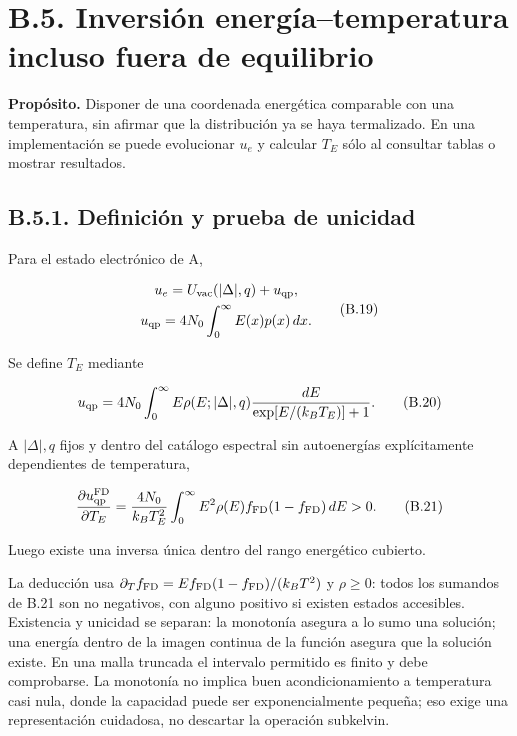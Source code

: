 \documentclass[
  spanish,
  10pt,
  a4paper,
]{article}
\begin{document}
\section{B.5. Inversión energía--temperatura incluso fuera de
equilibrio}\label{b.5.-inversiuxf3n-energuxedatemperatura-incluso-fuera-de-equilibrio}

\textbf{Propósito.} Disponer de una coordenada energética comparable con
una temperatura, sin afirmar que la distribución ya se haya termalizado.
En una implementación se puede evolucionar \(u_e\) y calcular \(T_E\)
sólo al consultar tablas o mostrar resultados.

\subsection{B.5.1. Definición y prueba de
unicidad}\label{b.5.1.-definiciuxf3n-y-prueba-de-unicidad}

Para el estado electrónico de A,

\[
\begin{gathered}
u_e=U_{\rm vac}(|\Delta|,q)+u_{\rm qp},\\
u_{\rm qp}=4N_0\int_0^\infty E(x)p(x)\,dx.
\end{gathered} \tag{B.19}
\]

Se define \(T_E\) mediante

\[
u_{\rm qp}=4N_0\int_0^\infty
E\rho(E;|\Delta|,q)\frac{dE}{\exp[E/(k_BT_E)]+1}.
\tag{B.20}
\]

A \(|\Delta|,q\) fijos y dentro del catálogo espectral sin autoenergías
explícitamente dependientes de temperatura,

\[
\frac{\partial u_{\rm qp}^{\rm FD}}{\partial T_E}
=\frac{4N_0}{k_BT_E^2}\int_0^\infty
E^2\rho(E)f_{\rm FD}(1-f_{\rm FD})\,dE>0. \tag{B.21}
\]

Luego existe una inversa única dentro del rango energético cubierto.

La deducción usa
\(\partial_T f_{\rm FD}=E f_{\rm FD}(1-f_{\rm FD})/(k_BT^2)\) y
\(\rho\geq0\): todos los sumandos de B.21 son no negativos, con alguno
positivo si existen estados accesibles. Existencia y unicidad se
separan: la monotonía asegura a lo sumo una solución; una energía dentro
de la imagen continua de la función asegura que la solución existe. En
una malla truncada el intervalo permitido es finito y debe comprobarse.
La monotonía no implica buen acondicionamiento a temperatura casi nula,
donde la capacidad puede ser exponencialmente pequeña; eso exige una
representación cuidadosa, no descartar la operación subkelvin.
\end{document}
